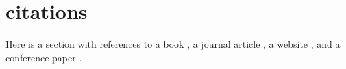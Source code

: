 \section{citations}
\label{sec:citations}
Here is a section with references to a book \citep{exampleBook}, a journal article \citep{exampleArticle}, a website \citep{exampleWebsite}, and a conference paper \citep{examplePaper}.

